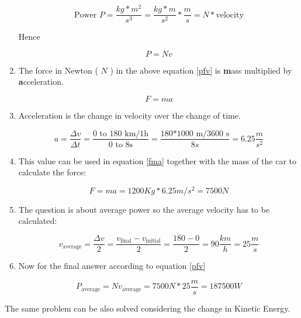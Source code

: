\begin{enumerate}
\begin{equation}
\textrm{Power }P=\frac{kg*m^2}{s^3}=\frac{kg*m}{s^2}*\frac{m}{s}=N*\textrm{velocity}
\end{equation}


Hence

\begin{equation}
\label{pfv}
P=Nv
\end{equation}

\item The force in Newton ( $N$ ) in the above equation \ref{pfv} is \textbf{m}ass multiplied by \textbf{a}cceleration.

\begin{equation}
\label{fma}
F=ma
\end{equation}


\item Acceleration is the change in velocity over the change of time.

\begin{equation}
a=\frac{\Delta v}{\Delta t}=\frac{\textrm{0 to 180 km/1h}}{\textrm{0 to 8s}}=\frac{\textrm{180*1000 m/3600 s}}{8s}=6.25\frac{m}{s^2}
\end{equation}

\item This value can be used in equation \ref{fma} together with the mass of the car to calculate the force:

\begin{equation}
F=ma=1200Kg*6.25m/s^2=7500 N
\end{equation}

\item The question is about average power so the average velocity has to be calculated:

\begin{equation}
v_\textrm{average}=\frac{\Delta v}{2}=\frac{v_\textrm{final}-v_\textrm{initial}}{2}=\frac{180-0}{2}=90\frac{km}{h}=25\frac{m}{s}
\end{equation}

\item Now for the final answer according to equation \ref{pfv}

\begin{equation}
P_\textrm{average}=Nv_\textrm{average}=7500 N * 25\frac{m}{s}=187500 W
\end{equation}

\end{enumerate}

The same problem can be also solved considering the change in Kinetic Energy.

